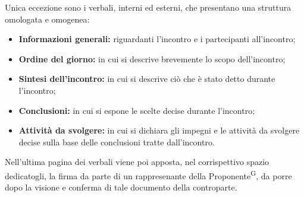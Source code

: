 \documentclass[8pt]{article}
\newcommand{\glossterm}[1]{#1\textsuperscript{G}} %
\begin{document}
Unica eccezione sono i verbali, interni ed esterni, che presentano una struttura omologata e omogenea:
\begin{itemize}
    \item \textbf{Informazioni generali:} riguardanti l'incontro e i partecipanti all'incontro;
    \item \textbf{Ordine del giorno:} in cui si descrive brevemente lo scopo dell'incontro;
    \item \textbf{Sintesi dell'incontro:} in cui si descrive ciò che è stato detto durante l'incontro;
    \item \textbf{Conclusioni:} in cui si espone le scelte decise durante l'incontro;
    \item \textbf{Attività da svolgere:} in cui si dichiara gli impegni e le attività da svolgere decise sulla base delle conclusioni tratte dall'incontro.
\end{itemize}
Nell'ultima pagina dei verbali viene poi apposta, nel corrispettivo spazio dedicatogli, la firma da parte di un rappresenante della \glossterm{Proponente}, da porre dopo la visione e conferma di tale documento della controparte.
\end{document}
